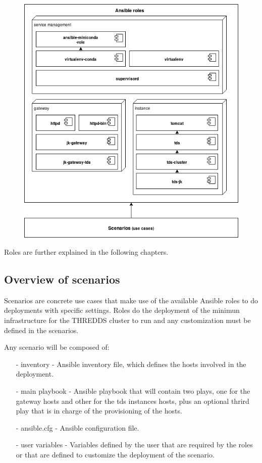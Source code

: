 \documentclass[a4paper,12pt]{article}
\begin{document}
\begin{figure}[h]
\includegraphics[width=1\textwidth]{images/roles.png}
\end{figure}

Roles are further explained in the following chapters.

\subsection{Overview of scenarios}

Scenarios are concrete use cases that make use of the available Ansible roles to do deployments with specific settings. Roles do the deployment of the minimun infrastructure for the THREDDS cluster to run and any customization must be defined in the scenarios.

Any scenario will be composed of:

\begin{itemize}
\item[-] inventory - Ansible inventory file, which defines the hosts involved in the deployment.
\item[-] main playbook - Ansible playbook that will contain two plays, one for the gateway hosts and other for the tds instances hosts, plus an optional thrird play that is in charge of the provisioning of the hosts.
\item[-] ansible.cfg - Ansible configuration file.
\item[-] user variables - Variables defined by the user that are required by the roles or that are defined to customize the deployment of the scenario.
\end{itemize}
\end{document}

